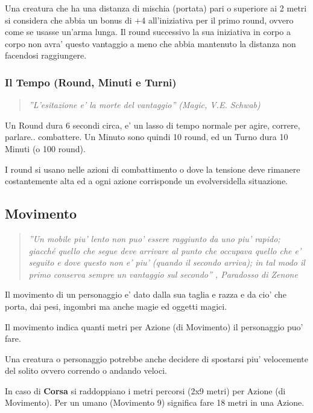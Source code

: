 \documentclass[a4paper,11pt,twoside,openany]{book}
\begin{document}
Una creatura che ha una distanza di mischia (portata) pari o superiore
ai 2 metri si considera che abbia un bonus di +4 all'iniziativa per
il primo round, ovvero come se usasse un'arma lunga. Il round successivo
la sua iniziativa in corpo a corpo non avra' questo vantaggio a meno
che abbia mantenuto la distanza non facendosi raggiungere.

\subsubsection{Il Tempo (Round, Minuti e Turni)}

\label{il-tempo-round-minuti-e-turni}
\begin{quote}\textit{
''L'esitazione e' la morte del vantaggio'' (Magic, V.E. Schwab)
}\end{quote}

Un Round dura 6 secondi circa, e' un lasso di tempo normale per agire, correre, parlare.. combattere. Un Minuto sono quindi 10 round, ed un Turno dura 10 Minuti (o 100 round).

I round si usano nelle azioni di combattimento o dove la tensione deve rimanere costantemente alta ed a ogni azione corrisponde un evolversidella situazione.

\pagebreak

\subsection{Movimento}

\label{movimento}

\begin{quote}\textit{''Un mobile piu' lento non puo' essere raggiunto da uno piu' rapido; giacché quello che segue deve arrivare al punto che occupava quello che e' seguito e dove questo non e' piu' (quando il secondo arriva); in tal modo il primo conserva sempre un vantaggio sul secondo'' , Paradosso di Zenone
}\end{quote}

Il movimento di un personaggio e' dato dalla sua taglia e razza e da cio' che porta, dai pesi, ingombri ma anche magie ed oggetti magici.

Il movimento indica quanti metri per Azione (di Movimento) il personaggio puo' fare.

Una creatura o personaggio potrebbe anche decidere di spostarsi piu' velocemente del solito ovvero correndo o andando veloci.

In caso di \textbf{Corsa} si raddoppiano i metri percorsi (2x9 metri) per Azione (di Movimento). Per un umano (Movimento 9) significa fare 18 metri in una Azione.
\end{document}
